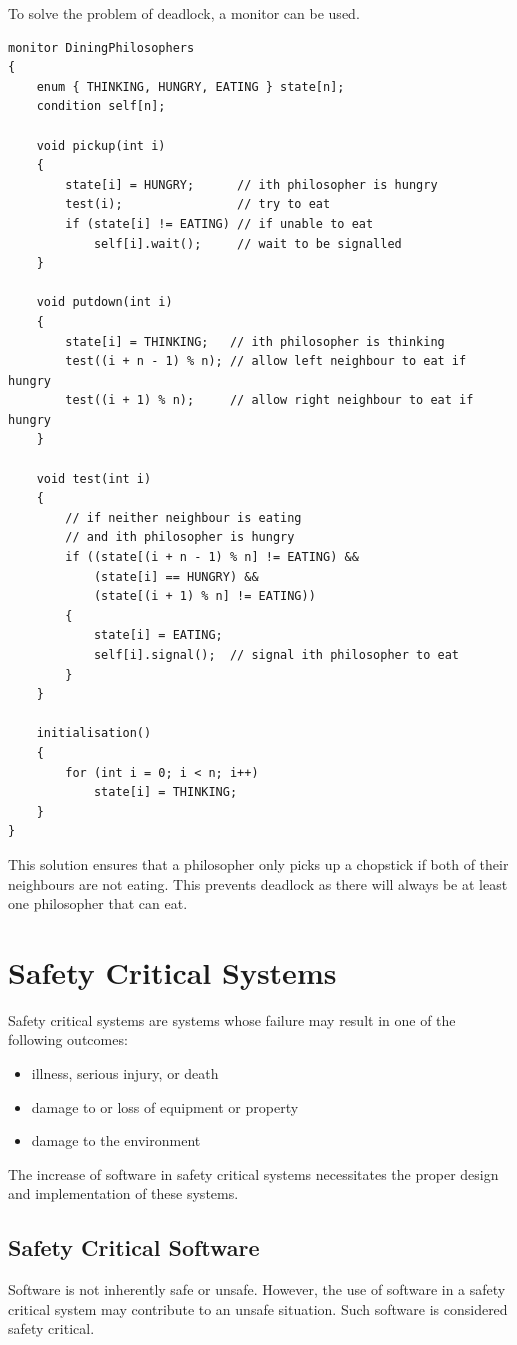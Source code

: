 \documentclass{article}
\begin{document}
To solve the problem of deadlock, a monitor can be used.
\begin{verbatim}
monitor DiningPhilosophers
{
    enum { THINKING, HUNGRY, EATING } state[n];
    condition self[n];

    void pickup(int i)
    {
        state[i] = HUNGRY;      // ith philosopher is hungry
        test(i);                // try to eat
        if (state[i] != EATING) // if unable to eat
            self[i].wait();     // wait to be signalled
    }

    void putdown(int i)
    {
        state[i] = THINKING;   // ith philosopher is thinking
        test((i + n - 1) % n); // allow left neighbour to eat if hungry
        test((i + 1) % n);     // allow right neighbour to eat if hungry
    }

    void test(int i)
    {
        // if neither neighbour is eating
        // and ith philosopher is hungry
        if ((state[(i + n - 1) % n] != EATING) &&
            (state[i] == HUNGRY) &&
            (state[(i + 1) % n] != EATING))
        {
            state[i] = EATING;
            self[i].signal();  // signal ith philosopher to eat
        }
    }

    initialisation()
    {
        for (int i = 0; i < n; i++)
            state[i] = THINKING;
    }
}
\end{verbatim}
This solution ensures that a philosopher only picks up a chopstick if
both of their neighbours are not eating. This prevents deadlock as
there will always be at least one philosopher that can eat.
\section{Safety Critical Systems}
Safety critical systems are systems whose failure may result in one of
the following outcomes:
\begin{itemize}
    \item illness, serious injury, or death
    \item damage to or loss of equipment or property
    \item damage to the environment
\end{itemize}
The increase of software in safety critical systems necessitates the
proper design and implementation of these systems.
\subsection{Safety Critical Software}
Software is not inherently safe or unsafe. However, the use of software
in a safety critical system may contribute to an unsafe situation. Such
software is considered safety critical.
\end{document}
